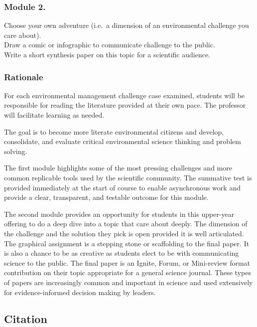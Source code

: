 \documentclass[
]{book}
\begin{document}
\hypertarget{module-2.}{%
\subsubsection*{Module 2.}\label{module-2.}}

Choose your own adventure (i.e.~a dimension of an environmental challenge you care about).\\
Draw a comic or infographic to communicate challenge to the public.\\
Write a short synthesis paper on this topic for a scientific audience.

\hypertarget{rationale}{%
\subsubsection*{Rationale}\label{rationale}}

For each environmental management challenge case examined, students will be responsible for reading the literature provided at their own pace. The professor will facilitate learning as needed.

The goal is to become more literate environmental citizens and develop, consolidate, and evaluate critical environmental science thinking and problem solving.

The first module highlights some of the most pressing challenges and more common replicable tools used by the scientific community. The summative test is provided immediately at the start of course to enable asynchronous work and provide a clear, transparent, and testable outcome for this module.

The second module provides an opportunity for students in this upper-year offering to do a deep dive into a topic that care about deeply. The dimension of the challenge and the solution they pick is open provided it is well articulated. The graphical assignment is a stepping stone or scaffolding to the final paper. It is also a chance to be as creative as students elect to be with communicating science to the public. The final paper is an Ignite, Forum, or Mini-review format contribution on their topic appropriate for a general science journal. These types of papers are increasingly common and important in science and used extensively for evidence-informed decision making by leaders.

\hypertarget{citation}{%
\subsection*{Citation}\label{citation}}
\end{document}
